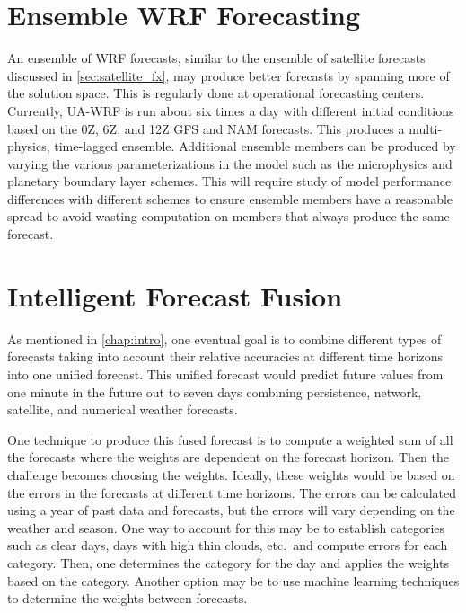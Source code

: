 \section{Ensemble WRF Forecasting}

An ensemble of WRF forecasts, similar to the ensemble of satellite
forecasts discussed in \cref{sec:satellite_fx}, may produce better
forecasts by spanning more of the solution space.
This is regularly done at operational forecasting centers.
Currently, UA-WRF is run about six times a day with different initial
conditions based on the 0Z, 6Z, and 12Z GFS and NAM forecasts.
This produces a multi-physics, time-lagged ensemble.
Additional ensemble members can be produced by varying the various
parameterizations in the model such as the microphysics and planetary
boundary layer schemes.
This will require study of model performance differences with
different schemes to ensure ensemble members have a reasonable spread
to avoid wasting computation on members that always produce the same
forecast.

\section{Intelligent Forecast Fusion}

As mentioned in \cref{chap:intro}, one eventual goal is to combine
different types of forecasts taking into account their relative
accuracies at different time horizons into one unified forecast.
This unified forecast would predict future values from one minute in
the future out to seven days combining persistence, network,
satellite, and numerical weather forecasts.

One technique to produce this fused forecast is to compute a weighted sum
of all the forecasts where the weights are dependent on the forecast
horizon.
Then the challenge becomes choosing the weights.
Ideally, these weights would be based on the errors in the forecasts
at different time horizons.
The errors can be calculated using a year of past data and forecasts,
but the errors will vary depending on the weather and season.
One way to account for this may be to establish categories such as
clear days, days with high thin clouds, etc.\ and compute errors for
each category.
Then, one determines the category for the day and applies the
weights based on the category.
Another option may be to use machine learning techniques to determine
the weights between forecasts.

